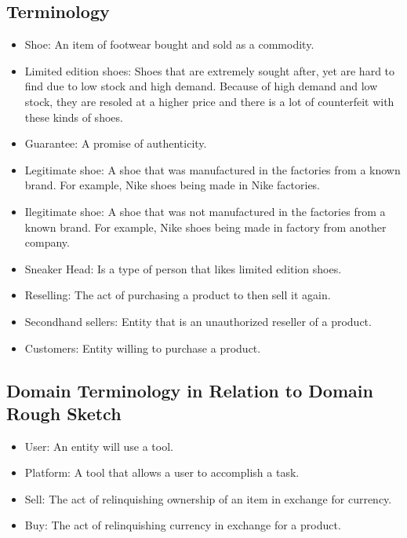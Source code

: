 \subsection{Terminology}
\begin{itemize}
  \item Shoe: An item of footwear bought and sold as a commodity.
  \item Limited edition shoes: Shoes that are extremely sought after, yet are hard to find due to low stock and high demand. Because of high demand and low stock, they are resoled at a higher price and there is a lot of counterfeit with these kinds of shoes.
  \item Guarantee: A promise of authenticity.
  \item Legitimate shoe: A shoe that was manufactured in the factories from a known brand. For example, Nike shoes being made in Nike factories.
  \item Ilegitimate shoe: A shoe that was not manufactured in the factories from a known brand. For example, Nike shoes being made in factory from another company.
  \item Sneaker Head: Is a type of person that likes limited edition shoes.
  \item Reselling: The act of purchasing a product to then sell it again.
  \item Secondhand sellers: Entity that is an unauthorized reseller of a product.
  \item Customers: Entity willing to purchase a product.
\end{itemize}
\subsection{Domain Terminology in Relation to Domain Rough Sketch}
\begin{itemize}
  \item User: An entity will use a tool.
  \item Platform: A tool that allows a user to accomplish a task.
  \item Sell: The act of relinquishing ownership of an item in exchange for currency.
  \item Buy: The act of relinquishing currency in exchange for a product.
\end{itemize}
